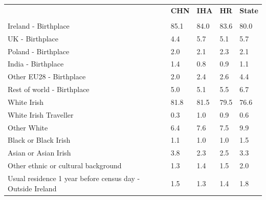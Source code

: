 \documentclass{article}
\begin{document}
\pagebreak
\begin{table}[h]	
\centering
		\begin{tabular}{KTTTT}
  \hline
& \textbf{CHN} & \textbf{IHA} & \textbf{HR}& \textbf{State}\\ 
  \hline
    \\ 
    \hline
Ireland - Birthplace & 85.1& 84.0& 83.6& 80.0\\
UK - Birthplace & 4.4& 5.7& 5.1& 5.7\\
Poland - Birthplace & 2.0& 2.1& 2.3& 2.1\\
India - Birthplace & 1.4& 0.8& 0.9& 1.1\\
Other EU28 - Birthplace & 2.0& 2.4& 2.6& 4.4\\
Rest of world - Birthplace & 5.0& 5.1& 5.5& 6.7\\
    \hline
White Irish & 81.8& 81.5& 79.5& 76.6\\
White Irish Traveller & 0.3& 1.0& 0.9& 0.6\\
Other White & 6.4& 7.6& 7.5& 9.9\\
Black or Black Irish & 1.1& 1.0& 1.0& 1.5\\
Asian or Asian Irish & 3.8& 2.3& 2.5& 3.3\\
Other ethnic or cultural background & 1.3& 1.4& 1.5& 2.0\\
    \hline
Usual residence 1 year before census day - Outside Ireland & 1.5& 1.3& 1.4& 1.8\\


\end{tabular}
\end{table}
\end{document}

